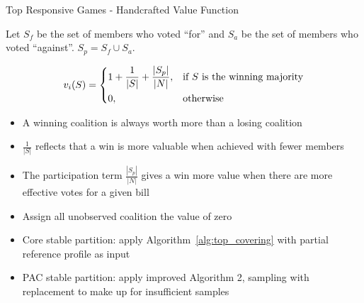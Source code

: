 \documentclass[xcolor=dvipsnames]{beamer}
\begin{document}
\begin{frame}{Top Responsive Games - Handcrafted Value Function}

  Let $S_f$ be the set of members who voted ``for'' and $S_a$ be the set of members who voted ``against''.
  $S_p = S_f \cup S_a$.

  \begin{equation}
    v_i(S) =
    \begin{dcases}
        1 + \frac{1}{|S|} + \frac{|S_p|}{|N|},& \text{if $S$ is the winning majority}\\
        0,              & \text{otherwise}
    \end{dcases}
  \end{equation}

  \begin{itemize}
      \item<only@1> A winning coalition is always worth more than a losing coalition
      \item<only@1> $\frac{1}{|S|}$ reflects that a win is more valuable when achieved with fewer members
      \item<only@1> The participation term $\frac{|S_p|}{|N|}$ gives a win more value when there are more effective votes for a given bill
      \item<only@1> Assign all unobserved coalition the value of zero
      \item<only@2> Core stable partition: apply Algorithm~\ref{alg:top_covering} with partial reference profile as input
      \item<only@2> PAC stable partition: apply improved Algorithm 2, sampling with replacement to make up for insufficient samples
  \end{itemize}
\end{frame}
\end{document}
